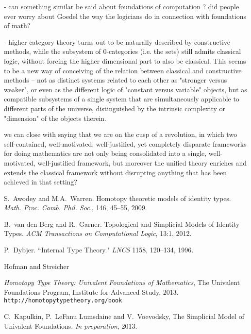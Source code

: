 \documentclass[11pt]{article}
\theoremstyle{remark}
\theoremstyle{definition}
\begin{document}
- can something similar be said about foundations of computation ?  did people ever worry about Goedel the way the logicians do in connection with foundations of math?

- higher category theory turns out to be naturally described by constructive methods, while the subsystem of 0-categories (i.e. the sets) still admits classical logic, without forcing the higher dimensional part to also be classical.  This seems to be a new way of conceiving of the relation between classical and constructive methods -- not as distinct systems related to each other as "stronger versus weaker", or even as the different  logic of "constant versus variable" objects, but as compatible subsystems of a single system that are simultaneously applicable to different parts of the universe, distinguished by the intrinsic complexity or "dimension" of the objects therein.

we can close with saying that we are on the cusp of a revolution, in which two self-contained, well-motivated, well-justified, yet completely disparate frameworks for doing mathematics are not only being consolidated into a single, well-motivated, well-justified framework, but moreover the unified theory enriches and extends the classical framework without disrupting anything that has been achieved in that setting?

\begin{thebibliography}{300}

S.~Awodey and M.A.~Warren. Homotopy theoretic models of identity types. \emph{Math. Proc. Camb. Phil. Soc.}, 146, 45--55, 2009.

B.~van den Berg and R.~Garner. Topological and Simplicial Models of Identity Types. \emph{ACM Transactions on Computational Logic}, 13:1, 2012.

P.~Dybjer. ``Internal Type Theory." \emph{LNCS} 1158, 120--134, 1996.

 Hofman and Streicher 

\emph{Homotopy Type Theory: Univalent Foundations of Mathematics}, The Univalent Foundations Program, Institute for Advanced Study, 2013. {\tt http://homotopytypetheory.org/book}

C.~Kapulkin, P.~LeFanu Lumsdaine and V.~Voevodsky, The Simplicial Model of Univalent Foundations. \emph{In preparation}, 2013.

%
\end{thebibliography}

\end{document}
